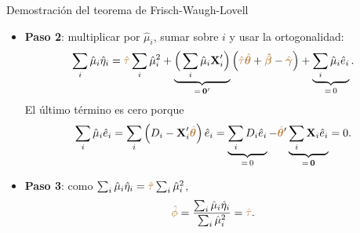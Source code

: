 \documentclass[9pt, xcolor=dvipsnames]{beamer}
\begin{document}
\begin{frame}{Demostración del teorema de Frisch-Waugh-Lovell}
\begin{itemize}
    \item \textbf{Paso 2}: multiplicar por \(\hat{\mu}_i\), sumar sobre \(i\) y usar la ortogonalidad:
    \begin{align*}
    \begin{split}
        \sum_i \hat{\mu}_i \hat{\eta}_i = \textcolor{brown}{\hat{\tau}} \sum_i \hat{\mu}^2_i + \underbrace{\Big(\sum_i \hat{\mu}_i \textbf{X}'_i\Big)}_{=\, \textbf{0}'}\left(\textcolor{brown}{\hat{\tau}}\textcolor{brown}{\hat{\boldsymbol{\theta}}} + \textcolor{brown}{\boldsymbol{\hat{\beta}}} - \textcolor{brown}{\hat{\boldsymbol{\gamma}}}\right) + \underbrace{\sum_i \hat{\mu}_i \hat{e}_i}_{=\, 0}.
    \end{split}
    \end{align*}
    El último término es cero porque
    \begin{align*}
    \begin{split}
        \sum_i \hat{\mu}_i \hat{e}_i = \sum_i \left(D_i - \textbf{X}'_i\textcolor{brown}{\hat{\boldsymbol{\theta}}}\right) \hat{e}_i = \underbrace{\sum_i D_i \hat{e}_i}_{=\, 0} - \textcolor{brown}{\hat{\boldsymbol{\theta}}}'\underbrace{\sum_i \textbf{X}_i \hat{e}_i}_{=\, \textbf{0}} = 0.
    \end{split}
    \end{align*}
    \item \textbf{Paso 3}: como \(\sum_i \hat{\mu}_i \hat{\eta}_i = \textcolor{brown}{\hat{\tau}} \sum_i \hat{\mu}^2_i\),
    \begin{align*}
    \begin{split}
        \textcolor{brown}{\hat{\phi}} = \frac{\sum_i \hat{\mu}_i \hat{\eta}_i}{\sum_i \hat{\mu}^2_i} = \textcolor{brown}{\hat{\tau}}.
    \end{split}
    \end{align*}
\end{itemize}
\end{frame}
\end{document}
